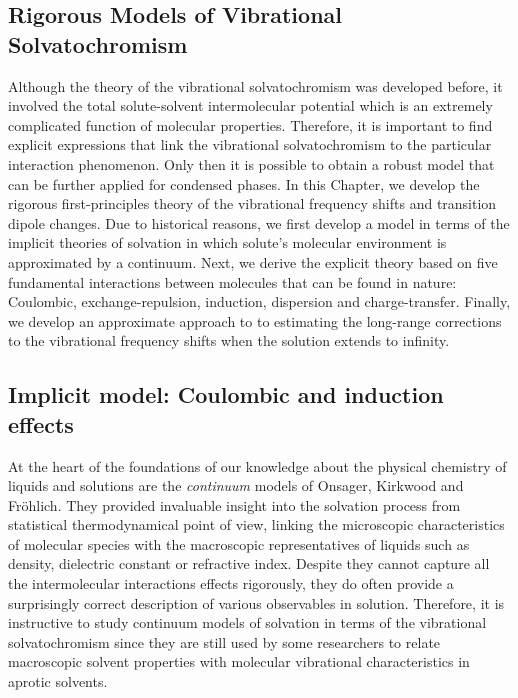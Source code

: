 \documentclass[a4paper,titlepage,twoside,fleqn,12pt]{book}
\begin{document}
\begin{refsection}
\chapter{Rigorous Models of Vibrational Solvatochromism \label{c:my-model}}

Although the theory of the vibrational solvatochromism
was developed before, it involved the total solute\hyp{}solvent
intermolecular potential which is an extremely complicated function
of molecular properties.
Therefore, it is important to find explicit 
expressions that link the vibrational solvatochromism
to the particular interaction phenomenon.
Only then it is possible to obtain a robust model
that can be further applied for condensed phases. 
In this Chapter, we develop the rigorous first\hyp{}principles
theory of the vibrational frequency shifts and transition
dipole changes.
Due to historical reasons, we first develop a model in terms
of the implicit theories of solvation in which solute's molecular
environment is approximated by a continuum. 
Next, we derive the explicit theory based on five fundamental interactions
between molecules that can be found in nature: Coulombic, 
exchange\hyp{}repulsion, induction, dispersion and charge\hyp{}transfer.
Finally, we develop an approximate approach to
to estimating the long\hyp{}range corrections to the vibrational
frequency shifts when the solution extends to infinity.

\section{Implicit model: Coulombic and induction effects}

At the heart of the foundations of our knowledge about the 
physical chemistry of liquids and solutions are the \emph{continuum}
models of Onsager, Kirkwood and Fr{\"o}hlich. They
provided invaluable insight into the solvation
process from statistical thermodynamical point of view, linking
the microscopic characteristics of molecular species
with the macroscopic representatives of liquids
such as density, dielectric constant or refractive index.
Despite they cannot capture all the intermolecular
interactions effects rigorously, they do often provide a surprisingly 
correct
description of various observables in solution.
Therefore, it is instructive to study continuum models of solvation
in terms of the vibrational solvatochromism since they 
are still used by some researchers to relate macroscopic
solvent properties with molecular vibrational characteristics
in aprotic solvents.


\end{refsection}
\end{document}
